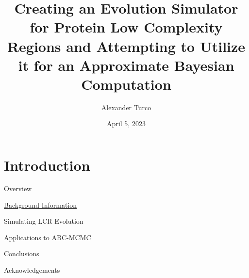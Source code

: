 \documentclass{beamer}
\title[BEAP Dec 2022]{Creating an Evolution Simulator for Protein Low Complexity Regions and Attempting to Utilize it for an Approximate Bayesian Computation}
\author{Alexander Turco}
\date{April 5, 2023}
\begin{document}
	
	\section{Introduction}
	\begin{frame}
		\titlepage 
	\end{frame}
	
	\logo{}
	
	\begin{frame}{Overview}
		
		\begin{center}
		\begin{minipage}{6cm}
				
		  		\begin{block}{} \hyperlink{link1}{Background Information} \end{block}
		  		\begin{block}{} Simulating LCR Evolution \end{block}
		  		\begin{block}{} Applications to ABC-MCMC \end{block}
		  		\begin{block}{} Conclusions \end{block}
		  		\begin{block}{} Acknowledgements \end{block}

		\end{minipage}
		\end{center}
	
	\end{frame}
	
\end{document}
